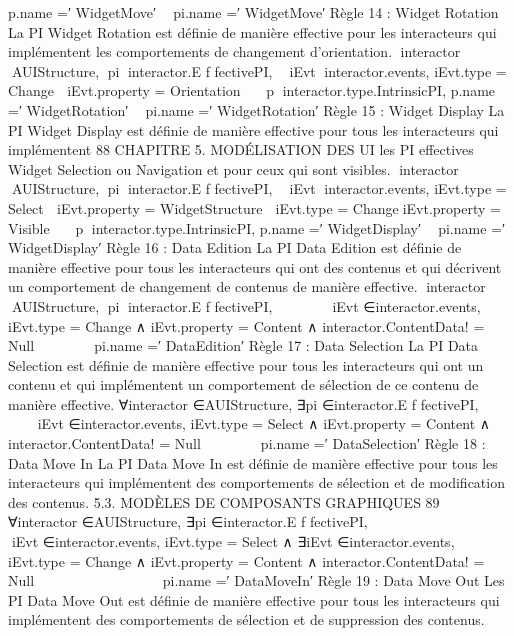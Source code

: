 \documentclass{article}
\begin{document}
p.name =′ WidgetMove′

⇒pi.name =′ WidgetMove′
R\`{e}gle 14 : Widget Rotation
La PI Widget Rotation est d\'{e}ﬁnie de mani\`{e}re effective pour les interacteurs qui impl\'{e}mentent les
comportements de changement d’orientation.
∀interactor ∈AUIStructure,
∃pi ∈interactor.E f fectivePI,
∧
∃iEvt ∈interactor.events,
iEvt.type = Change
∧
iEvt.property = Orientation
∧
 ∃p ∈interactor.type.IntrinsicPI,
p.name =′ WidgetRotation′

⇒pi.name =′ WidgetRotation′
R\`{e}gle 15 : Widget Display
La PI Widget Display est d\'{e}ﬁnie de mani\`{e}re effective pour tous les interacteurs qui impl\'{e}mentent
88
CHAPITRE 5. MODÉLISATION DES UI
les PI effectives Widget Selection ou Navigation et pour ceux qui sont visibles.
∀interactor ∈AUIStructure, ∃pi ∈interactor.E f fectivePI,
∧
∃iEvt ∈interactor.events, iEvt.type = Select
∧
iEvt.property = WidgetStructure
∨
iEvt.type = Change∧iEvt.property = Visible
∧
 ∃p ∈interactor.type.IntrinsicPI,
p.name =′ WidgetDisplay′

⇒pi.name =′ WidgetDisplay′
R\`{e}gle 16 : Data Edition
La PI Data Edition est d\'{e}ﬁnie de mani\`{e}re effective pour tous les interacteurs qui ont des contenus
et qui d\'{e}crivent un comportement de changement de contenus de mani\`{e}re effective.
∀interactor ∈AUIStructure, ∃pi ∈interactor.E f fectivePI,






∃iEvt ∈interactor.events, iEvt.type = Change
∧
iEvt.property = Content
∧
interactor.ContentData! = Null






⇒pi.name =′ DataEdition′
R\`{e}gle 17 : Data Selection
La PI Data Selection est d\'{e}ﬁnie de mani\`{e}re effective pour tous les interacteurs qui ont un contenu
et qui impl\'{e}mentent un comportement de s\'{e}lection de ce contenu de mani\`{e}re effective.
∀interactor ∈AUIStructure, ∃pi ∈interactor.E f fectivePI,






∃iEvt ∈interactor.events, iEvt.type = Select
∧
iEvt.property = Content
∧
interactor.ContentData! = Null






⇒pi.name =′ DataSelection′
R\`{e}gle 18 : Data Move In
La PI Data Move In est d\'{e}ﬁnie de mani\`{e}re effective pour tous les interacteurs qui impl\'{e}mentent
des comportements de s\'{e}lection et de modiﬁcation des contenus.
5.3. MODÈLES DE COMPOSANTS GRAPHIQUES
89
∀interactor ∈AUIStructure,
∃pi ∈interactor.E f fectivePI,














∃iEvt ∈interactor.events,
iEvt.type = Select
∧
∃iEvt ∈interactor.events,
iEvt.type = Change
∧
iEvt.property = Content
∧
interactor.ContentData! = Null














⇒pi.name =′ DataMoveIn′
R\`{e}gle 19 : Data Move Out
Les PI Data Move Out est d\'{e}ﬁnie de mani\`{e}re effective pour tous les interacteurs qui impl\'{e}mentent
des comportements de s\'{e}lection et de suppression des contenus.
\end{document}
